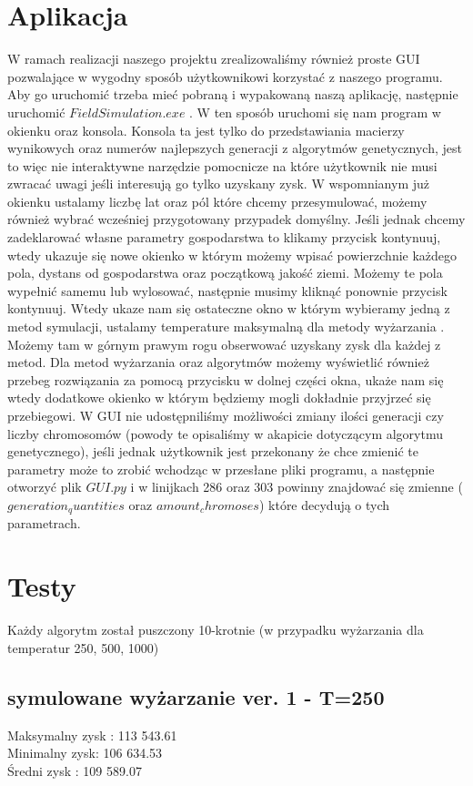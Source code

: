 \documentclass{article}
\begin{document}
\section{Aplikacja}
W ramach realizacji naszego projektu zrealizowaliśmy również proste GUI pozwalające w wygodny sposób użytkownikowi korzystać z naszego programu. Aby go uruchomić trzeba mieć pobraną i wypakowaną naszą aplikację, następnie uruchomić $FieldSimulation.exe$ . W ten sposób uruchomi się nam program w okienku oraz konsola. Konsola ta jest tylko do przedstawiania macierzy wynikowych oraz numerów najlepszych generacji z algorytmów genetycznych, jest to więc nie interaktywne narzędzie pomocnicze na które użytkownik nie musi zwracać uwagi jeśli interesują go tylko uzyskany zysk. W wspomnianym już okienku  ustalamy liczbę lat oraz pól które chcemy przesymulować, możemy również wybrać wcześniej przygotowany przypadek domyślny. Jeśli jednak chcemy zadeklarować własne parametry gospodarstwa to klikamy przycisk kontynuuj, wtedy ukazuje się nowe okienko w którym możemy wpisać powierzchnie każdego pola, dystans od gospodarstwa oraz początkową jakość ziemi. Możemy te pola wypełnić samemu lub wylosować, następnie musimy kliknąć ponownie przycisk kontynuuj. Wtedy ukaze nam się ostateczne okno w którym wybieramy jedną z metod symulacji, ustalamy temperature maksymalną dla metody wyżarzania . Możemy tam w górnym prawym rogu obserwować uzyskany zysk dla każdej z metod. Dla metod wyżarzania oraz algorytmów możemy wyświetlić również przebeg rozwiązania za pomocą przycisku w dolnej części okna, ukaże nam się wtedy dodatkowe okienko w którym będziemy mogli dokładnie przyjrzeć się przebiegowi. W  GUI nie udostępniliśmy możliwości zmiany ilości generacji czy liczby chromosomów (powody te opisaliśmy w akapicie dotyczącym algorytmu genetycznego), jeśli jednak użytkownik jest przekonany że chce zmienić te parametry może to zrobić wchodząc w przesłane pliki programu, a następnie otworzyć plik $GUI.py$ i w linijkach 286 oraz 303 powinny znajdować się zmienne ($generation_quantities$ oraz $amount_chromoses$) które decydują o tych parametrach.

\section{Testy}
Każdy algorytm został puszczony 10-krotnie (w przypadku wyżarzania dla temperatur 250, 500, 1000)

\subsection{symulowane wyżarzanie ver. 1 - T=250}
Maksymalny zysk : 113 543.61\\
Minimalny zysk: 106 634.53\\
Średni zysk : 109 589.07\\
\end{document}
